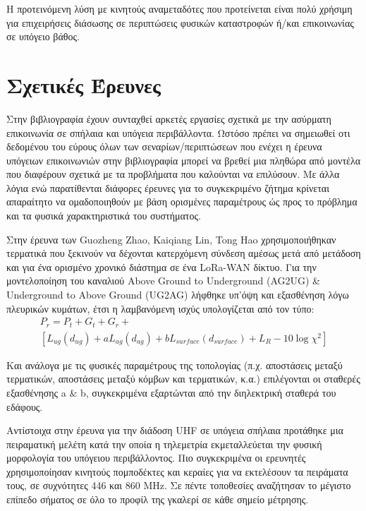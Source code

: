 \documentclass[12pt]{article}
\begin{document}
\begin{multicols*}{2}
        Η προτεινόμενη λύση με κινητούς αναμεταδότες που προτείνεται είναι πολύ χρήσιμη
        για επιχειρήσεις διάσωσης σε περιπτώσεις φυσικών καταστροφών ή/και επικοινωνίας σε
        υπόγειο βάθος.

    \section{\textsf{Σχετικές Έρευνες}} Στην βιβλιογραφία έχουν συνταχθεί
        αρκετές εργασίες σχετικά με την ασύρματη επικοινωνία σε σπήλαια και υπόγεια
        περιβάλλοντα. Ωστόσο πρέπει να σημειωθεί οτι δεδομένου του εύρους όλων των 
        σεναρίων/περιπτώσεων που ενέχει η έρευνα υπόγειων επικοινωνιών στην βιβλιογραφία
        μπορεί να βρεθεί μια πληθώρα από μοντέλα που διαφέρουν σχετικά με τα προβλήματα που
        καλούνται να επιλύσουν. Με άλλα λόγια ενώ παρατίθενται διάφορες έρευνες για το 
        συγκεκριμένο ζήτημα κρίνεται απαραίτητο να ομαδοποιηθούν με βάση ορισμένες παραμέτρους
        ώς προς το πρόβλημα και τα φυσικά χαρακτηριστικά του συστήματος.
        
        Στην έρευνα των Guozheng Zhao, Kaiqiang Lin, Tong Hao \cite{zhao_feasibility_2023}
        χρησιμοποιήθηκαν τερματικά που ξεκινούν να δέχονται κατερχόμενη σύνδεση αμέσως μετά 
        από μετάδοση και για ένα ορισμένο χρονικό διάστημα σε ένα LoRa-WAN δίκτυο.
        Για την μοντελοποίηση του καναλιού Above Ground to Underground (AG2UG) \& 
        Underground to Above Ground (UG2AG) λήφθηκε υπ'όψη και εξασθένηση λόγω πλευρικών
        κυμάτων, έτσι η λαμβανόμενη ισχύς υπολογίζεται από τον τύπο:\\
        \begin{multline} \label{eq:1}
            P_r = P_t + G_t + G_r + \\ 
                [L_{ug}(d_{ug}) + aL_{ag}(d_{ag}) + bL_{surface}(d_{surface}) + L_R - 10\log\chi^2]
        \end{multline}
        
        Και ανάλογα με τις φυσικές παραμέτρους της τοπολογίας (π.χ. αποστάσεις μεταξύ
        τερματικών, αποστάσεις μεταξύ κόμβων και τερματικών, κ.α.) επιλέγονται οι 
        σταθερές εξασθένησης a \& b, συγκεκριμένα εξαρτώνται από την διηλεκτρική 
        σταθερά του εδάφους.

        Αντίστοιχα στην έρευνα για την διάδοση UHF σε υπόγεια σπήλαια \cite{rak_uhf_2007}
        προτάθηκε μια πειραματική μελέτη κατά την οποία η τηλεμετρία εκμεταλλεύεται την φυσική
        μορφολογία του υπόγειου περιβάλλοντος. Πιο συγκεκριμένα οι ερευνητές χρησιμοποίησαν
        κινητούς πομποδέκτες και κεραίες για να εκτελέσουν τα πειράματα τους, σε συχνότητες 
        446 και 860 MHz. Σε πέντε τοποθεσίες αναζήτησαν το μέγιστο επίπεδο σήματος σε όλο το
        προφίλ της γκαλερί σε κάθε σημείο μέτρησης.


\end{multicols*}
\end{document}
